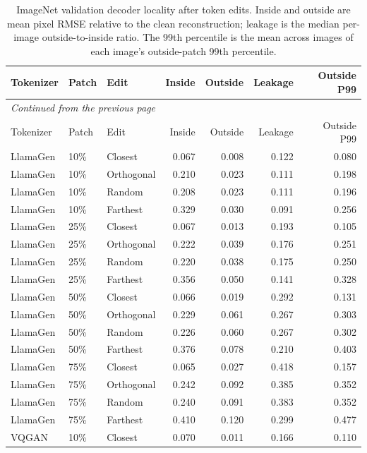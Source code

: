 \begingroup
\small
\setlength{\tabcolsep}{4pt}
\begin{longtable}{lllrrrr}
\caption[ImageNet validation decoder locality after token edits]{ImageNet validation decoder locality after token edits. Inside and outside are mean pixel RMSE relative to the clean reconstruction; leakage is the median per-image outside-to-inside ratio. The 99th percentile is the mean across images of each image's outside-patch 99th percentile.}\label{tab:app_imagenet_val_locality}\\
\hline
Tokenizer & Patch & Edit & Inside & Outside & Leakage & Outside P99 \\ \hline
\endfirsthead
\multicolumn{7}{l}{\small\itshape Continued from the previous page}\\
\hline
Tokenizer & Patch & Edit & Inside & Outside & Leakage & Outside P99 \\ \hline
\endhead
\hline
\endfoot
LlamaGen & 10\% & Closest & 0.067 & 0.008 & 0.122 & 0.080 \\
LlamaGen & 10\% & Orthogonal & 0.210 & 0.023 & 0.111 & 0.198 \\
LlamaGen & 10\% & Random & 0.208 & 0.023 & 0.111 & 0.196 \\
LlamaGen & 10\% & Farthest & 0.329 & 0.030 & 0.091 & 0.256 \\
LlamaGen & 25\% & Closest & 0.067 & 0.013 & 0.193 & 0.105 \\
LlamaGen & 25\% & Orthogonal & 0.222 & 0.039 & 0.176 & 0.251 \\
LlamaGen & 25\% & Random & 0.220 & 0.038 & 0.175 & 0.250 \\
LlamaGen & 25\% & Farthest & 0.356 & 0.050 & 0.141 & 0.328 \\
LlamaGen & 50\% & Closest & 0.066 & 0.019 & 0.292 & 0.131 \\
LlamaGen & 50\% & Orthogonal & 0.229 & 0.061 & 0.267 & 0.303 \\
LlamaGen & 50\% & Random & 0.226 & 0.060 & 0.267 & 0.302 \\
LlamaGen & 50\% & Farthest & 0.376 & 0.078 & 0.210 & 0.403 \\
LlamaGen & 75\% & Closest & 0.065 & 0.027 & 0.418 & 0.157 \\
LlamaGen & 75\% & Orthogonal & 0.242 & 0.092 & 0.385 & 0.352 \\
LlamaGen & 75\% & Random & 0.240 & 0.091 & 0.383 & 0.352 \\
LlamaGen & 75\% & Farthest & 0.410 & 0.120 & 0.299 & 0.477 \\
VQGAN & 10\% & Closest & 0.070 & 0.011 & 0.166 & 0.110 \\

\end{longtable}
